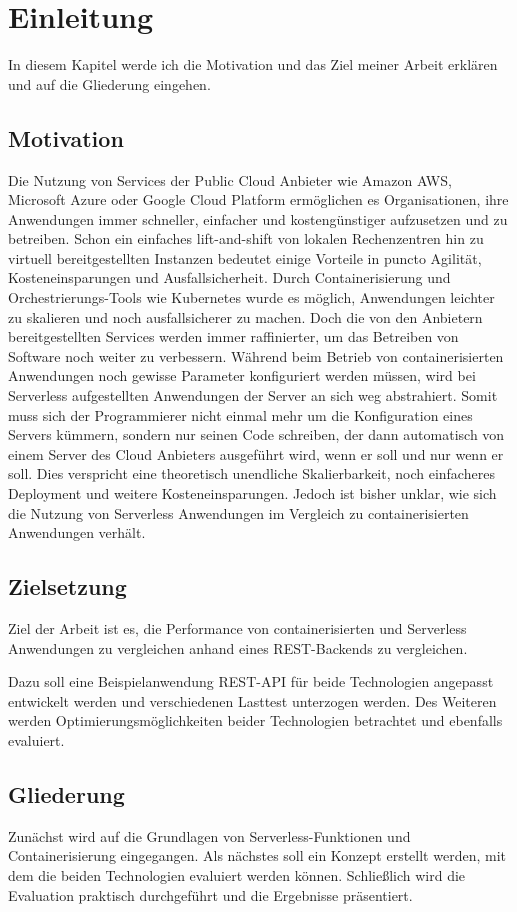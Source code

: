 \chapter{Einleitung}
In diesem Kapitel werde ich die Motivation und das Ziel meiner Arbeit erklären und auf die Gliederung eingehen.

\section{Motivation}
Die Nutzung von Services der Public Cloud Anbieter wie Amazon AWS, Microsoft Azure oder Google Cloud Platform ermöglichen es Organisationen, ihre Anwendungen immer schneller, einfacher und kostengünstiger aufzusetzen und zu betreiben. Schon ein einfaches lift-and-shift von lokalen Rechenzentren hin zu virtuell bereitgestellten Instanzen bedeutet einige Vorteile in puncto Agilität, Kosteneinsparungen und Ausfallsicherheit. Durch Containerisierung und Orchestrierungs-Tools wie Kubernetes wurde es möglich, Anwendungen leichter zu skalieren und noch ausfallsicherer zu machen. Doch die von den Anbietern bereitgestellten Services werden immer raffinierter, um das Betreiben von Software noch weiter zu verbessern. Während beim Betrieb von containerisierten Anwendungen noch gewisse Parameter konfiguriert werden müssen, wird bei Serverless aufgestellten Anwendungen der Server an sich weg abstrahiert. Somit muss sich der Programmierer nicht einmal mehr um die Konfiguration eines Servers kümmern, sondern nur seinen Code schreiben, der dann automatisch von einem Server des Cloud Anbieters ausgeführt wird, wenn er soll und nur wenn er soll. Dies verspricht eine theoretisch unendliche Skalierbarkeit, noch einfacheres Deployment und weitere Kosteneinsparungen. Jedoch ist bisher unklar, wie sich die Nutzung von Serverless Anwendungen im Vergleich zu containerisierten Anwendungen verhält. 

\section{Zielsetzung}
Ziel der Arbeit ist es, die Performance von containerisierten und Serverless Anwendungen zu vergleichen anhand eines REST-Backends zu vergleichen.

Dazu soll eine Beispielanwendung REST-API für beide Technologien angepasst entwickelt werden und verschiedenen Lasttest unterzogen werden. Des Weiteren werden Optimierungsmöglichkeiten beider Technologien betrachtet und ebenfalls evaluiert.

\section{Gliederung}
Zunächst wird auf die Grundlagen von Serverless-Funktionen und Containerisierung eingegangen. Als nächstes soll ein Konzept erstellt werden, mit dem die beiden Technologien evaluiert werden können. Schließlich wird die Evaluation praktisch durchgeführt und die Ergebnisse präsentiert.